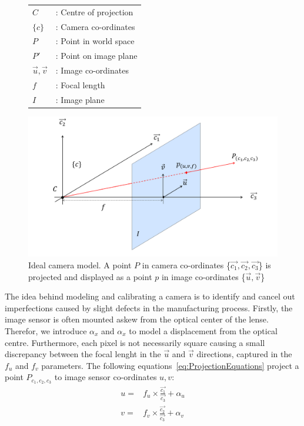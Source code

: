 \documentclass{UoNMCHA}
\numberwithin{equation}{section}
\begin{document}
\begin{figure}[ht]
	\begin{minipage}[c]{0.3\linewidth}
		\centering
		\begin{tabular}{l l}
			$C$ &: Centre of projection\\
			$\{c\}$ &: Camera co-ordinates\\
			$P$ &: Point in world space\\
			$P'$ &: Point on image plane\\
			$\vec{u}, \vec{v}$ &: Image co-ordinates\\
			$f$ &: Focal length\\
			$I$ &: Image plane
		\end{tabular}
	\end{minipage}
	\begin{minipage}[c]{0.65\linewidth}
		\includegraphics[width=1\linewidth]{Figures/Planar_Model}	
	\end{minipage}
\caption{Ideal camera model. A point $P$ in camera co-ordinates \{$\vec{c_{1}}, \vec{c_{2}}, \vec{c_{3}}$\} is projected and displayed as a point $p$ in image co-ordinates \{$\vec{u}, \vec{v}$\}}
\label{fig:PlainarModel}
\end{figure}
The idea behind modeling and calibrating a camera is to identify and cancel out imperfections caused by slight defects in the manufacturing process. Firstly, the image sensor is often mounted askew from the optical center of the lense. Therefor, we introduce $\alpha_{x}$ and $\alpha_{x}$ to model a displacement from the optical centre. Furthermore, each pixel is not necessarily square causing a small discrepancy between the focal lenght in the $\vec{u}$ and $\vec{v}$ directions, captured in the $f_{u}$ and $f_{v}$ parameters. The following equations~\ref{eq:ProjectionEquations} project a point $P_{c_{1}, c_{2}, c_{3}}$ to image sensor co-ordinates $u, v$:
\begin{equation*}\label{eq:ProjectionEquations}
	\begin{split}
		u = &f_{u} \times \frac{\vec{c_{1}}}{\vec{c_{3}}} + \alpha_{u}\\
		v = &f_{v} \times \frac{\vec{c_{2}}}{\vec{c_{3}}} + \alpha_{v}
	\end{split}
\end{equation*}
\end{document}
